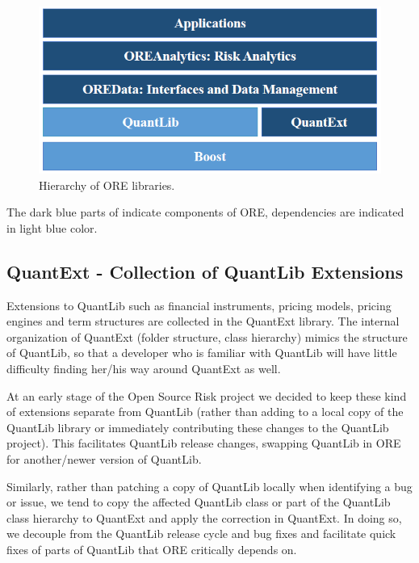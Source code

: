 \documentclass[12pt, a4paper]{article}
\begin{document}
\begin{figure}[h]
\begin{center}
\includegraphics[scale=0.6]{Overview}
\end{center}
\caption{Hierarchy of ORE libraries. }
\label{fig_Hierarchy}
\end{figure}

The dark blue parts of indicate components of ORE, dependencies are indicated in light blue color.

\subsection*{QuantExt - Collection of QuantLib Extensions}

Extensions to QuantLib such as financial instruments, pricing models, pricing engines and term structures are collected in the QuantExt library. 
The internal organization of QuantExt (folder structure, class hierarchy) mimics the structure of QuantLib, so that a developer who is familiar with QuantLib will have little difficulty finding her/his way around QuantExt as well.

At an early stage of the Open Source Risk project we decided to keep these kind of extensions separate from QuantLib (rather than adding to a local copy of the QuantLib library or immediately contributing these changes to the QuantLib project).
This facilitates QuantLib release changes, swapping QuantLib in ORE for another/newer version of QuantLib.

Similarly, rather than patching a copy of QuantLib locally when identifying a bug or issue, we tend to copy the affected QuantLib class or part of the QuantLib class hierarchy to QuantExt and apply the correction in QuantExt. In doing so, we decouple
from the QuantLib release cycle and bug fixes and facilitate quick fixes of parts of QuantLib that ORE critically depends on.
\end{document}
